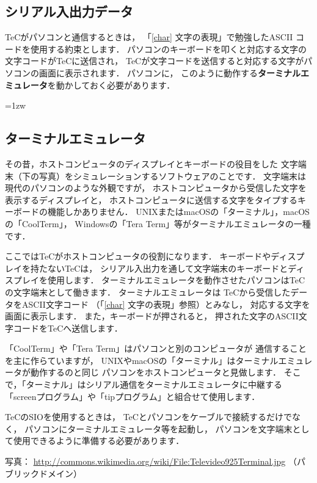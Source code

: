 \subsection{シリアル入出力データ}
TeCがパソコンと通信するときは，
「\ref{char} 文字の表現」で勉強したASCII コードを使用する約束とします．
パソコンのキーボードを叩くと対応する文字の文字コードがTeCに送信され，
TeCが文字コードを送信すると対応する文字がパソコンの画面に表示されます．
パソコンに，
このように動作する{\bf ターミナルエミュレータ}を動かしておく必要があります．

\newpage
\begin{framed}{\parindent=1zw
\subsection*{ターミナルエミュレータ}\label{terminal}{\small
その昔，ホストコンピュータのディスプレイとキーボードの役目をした
文字端末（下の写真）をシミュレーションするソフトウェアのことです．
文字端末は現代のパソコンのような外観ですが，
ホストコンピュータから受信した文字を表示するディスプレイと，
ホストコンピュータに送信する文字をタイプするキーボードの機能しかありません．
UNIXまたはmacOSの「ターミナル」，macOSの「CoolTerm」，
Windowsの「Tera Term」等がターミナルエミュレータの一種です．

ここではTeCがホストコンピュータの役割になります．
キーボードやディスプレイを持たないTeCは，
シリアル入出力を通して文字端末のキーボードとディスプレイを使用します．
ターミナルエミュレータを動作させたパソコンはTeCの文字端末として働きます．
ターミナルエミュレータは
TeCから受信したデータをASCII文字コード
（「\ref{char} 文字の表現」参照）とみなし，
対応する文字を画面に表示します．
また，キーボードが押されると，
押された文字のASCII文字コードをTeCへ送信します．

「CoolTerm」や「Tera Term」はパソコンと別のコンピュータが
通信することを主に作らていますが，
UNIXやmacOSの「ターミナル」はターミナルエミュレータが動作するのと同じ
パソコンをホストコンピュータと見做します．
そこで，「ターミナル」はシリアル通信をターミナルエミュレータに中継する
「screenプログラム」や「tipプログラム」と組合せて使用します．

TeCのSIOを使用するときは，
TeCとパソコンをケーブルで接続するだけでなく，
パソコンにターミナルエミュレータ等を起動し，
パソコンを文字端末として使用できるように準備する必要があります．
\begin{center}
\end{center}
写真：
\url{http://commons.wikimedia.org/wiki/File:Televideo925Terminal.jpg}
（パブリックドメイン）
}}\end{framed}

